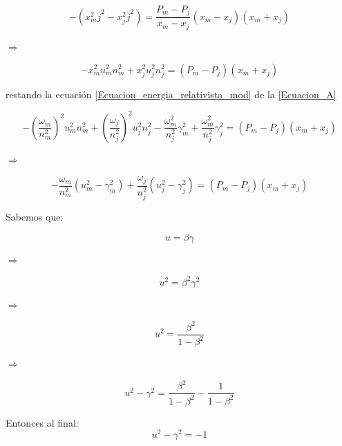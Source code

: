 \documentclass[12pt,a4paper]{book}
\begin{document}
\begin{equation*}
- \left( x_m^2 \overline{j}^{2}-x_j^2 \overline{j}^{2} \right) =
\frac{P_m-P_j}{x_m-x_j} \left( x_m-x_j \right) \left( x_m+x_j \right)
\end{equation*}

$\Rightarrow$

\begin{equation} \label{Ecuacion_A}
-x_m^2 u_m^2 n_m^2 + x_j^2 u_j^2 n_j^2 =
\left( P_m-P_j \right) \left( x_m+x_j \right) 
\end{equation}

restando la ecuación \ref{Ecuacion_energia_relativista_mod} de la \ref{Ecuacion_A}

\begin{equation}
-\left( \frac{\omega_{m}}{n_m^2}\right)^2 u_m^2 n_m^2 +
\left( \frac{\omega_{j}}{n_j^2}\right)^2 u_j^2 n_j^2 -
\frac{\omega_m^2}{n_j^2}\gamma_m^2 +
\frac{\omega_m^2}{n_j^2}\gamma_j^2
=
\left( P_m-P_j \right) \left( x_m+x_j \right) 
\end{equation}

$\Rightarrow$

\begin{equation} \label{ec_mod_beta-lor}
-\frac{\omega_{m}}{n_m^2} \left( u_m^2-\gamma_m^2 \right)
+\frac{\omega_{j}}{n_j^2} \left( u_j^2-\gamma_j^2 \right)
=\left( P_m-P_j \right) \left( x_m+x_j \right) 
\end{equation}


Sabemos que:

\begin{equation}
u = \beta \gamma
\end{equation}

$\Rightarrow$

\begin{equation}
u^2 = \beta^2 \gamma^2 
\end{equation}

$\Rightarrow$

\begin{equation}
u^2 = \frac{\beta^2}{1-\beta^2} 
\end{equation}

$\Rightarrow$

\begin{equation}
u^2-\gamma^2 = \frac{\beta^2}{1-\beta^2}-\frac{1}{1-\beta^2}
\end{equation}

Entonces al final:
\begin{equation} \label{beta-lor}
u^2-\gamma^2 = -1
\end{equation}
\end{document}
